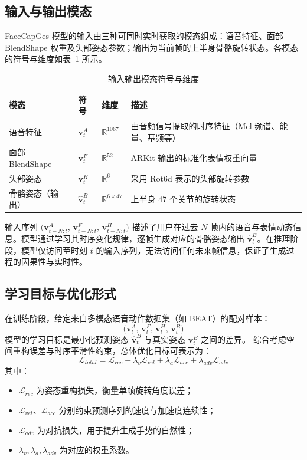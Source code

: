 \subsection{输入与输出模态}

FaceCapGes 模型的输入由三种可同时实时获取的模态组成：语音特征、面部 BlendShape 权重及头部姿态参数；输出为当前帧的上半身骨骼旋转状态。各模态的符号与维度如表~\ref{tab:modalities} 所示。

\begin{table}[h]
\centering
\caption{输入输出模态符号与维度}
\label{tab:modalities}
\begin{tabular}{llll}
\toprule
\textbf{模态} & \textbf{符号} & \textbf{维度} & \textbf{描述} \\
\midrule
语音特征 & $\bm{v}_t^{A}$ & $\mathbb{R}^{1067}$ & 由音频信号提取的时序特征（Mel 频谱、能量、基频等） \\
面部 BlendShape & $\bm{v}_t^{F}$ & $\mathbb{R}^{52}$ & ARKit 输出的标准化表情权重向量 \\
头部姿态 & $\bm{v}_t^{H}$ & $\mathbb{R}^{6}$ & 采用 Rot6d 表示的头部旋转参数 \\
骨骼姿态（输出） & $\hat{\bm{v}}_t^{B}$ & $\mathbb{R}^{6 \times 47}$ & 上半身 47 个关节的旋转状态 \\
\bottomrule
\end{tabular}
\end{table}

输入序列 $\big(\bm{v}_{t-N:t}^{A},\, \bm{v}_{t-N:t}^{F},\, \bm{v}_{t-N:t}^{H}\big)$ 描述了用户在过去 $N$ 帧内的语音与表情动态信息。模型通过学习其时序变化规律，逐帧生成对应的骨骼姿态输出 $\hat{\bm{v}}_t^{B}$。在推理阶段，模型仅访问至时刻 $t$ 的输入序列，无法访问任何未来帧信息，保证了生成过程的因果性与实时性。

\subsection{学习目标与优化形式}

在训练阶段，给定来自多模态语音动作数据集（如 BEAT）的配对样本：
\begin{equation}
\big(\bm{v}_t^{A},\, \bm{v}_t^{F},\, \bm{v}_t^{H},\, \bm{v}_t^{B}\big)
\end{equation}
模型的学习目标是最小化预测姿态 $\hat{\bm{v}}_t^{B}$ 与真实姿态 $\bm{v}_t^{B}$ 之间的差异。
综合考虑空间重构误差与时序平滑性约束，总体优化目标可表示为：
\begin{equation}
\mathcal{L}_{total} =
\mathcal{L}_{rec} + \lambda_v \mathcal{L}_{vel} + \lambda_a \mathcal{L}_{acc} + \lambda_{adv} \mathcal{L}_{adv}
\end{equation}
其中：
\begin{itemize}
    \item $\mathcal{L}_{rec}$ 为姿态重构损失，衡量单帧旋转角度误差；
    \item $\mathcal{L}_{vel}$、$\mathcal{L}_{acc}$ 分别约束预测序列的速度与加速度连续性；
    \item $\mathcal{L}_{adv}$ 为对抗损失，用于提升生成手势的自然性；
    \item $\lambda_v, \lambda_a, \lambda_{adv}$ 为对应的权重系数。
\end{itemize}

